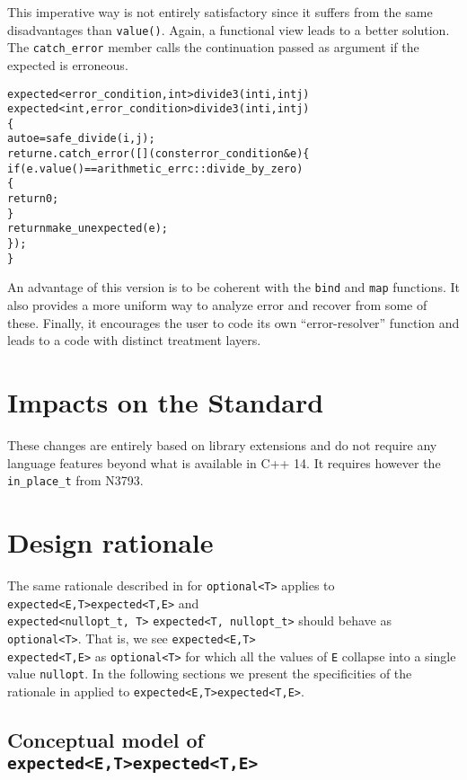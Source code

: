\documentclass[a4paper,10pt]{article}
\newcommand{\cpp}[1]{\lstinline{#1}}
\newcommand{\suppress}[1]{\colorbox{suppress_color}{#1}}
\newcommand{\update}[1]{\colorbox{update_color}{#1}}
\begin{document}
This imperative way is not entirely satisfactory since it suffers from the same disadvantages than \cpp{value()}. Again, a functional view leads to a better solution. The \cpp{catch_error} member calls the continuation passed as argument if the expected is erroneous.

\begin{alltt}
\suppress{expected<error_condition, int> divide3(int i, int j)}
\update{expected<int, error_condition> divide3(int i, int j)}
\{
  auto e = safe_divide(i,j);
  return e.catch_error([](const error_condition& e)\{
    if(e.value() == arithmetic_errc::divide_by_zero)
    \{
      return 0;
    \}
    return make_unexpected(e);
  \});
\}
\end{alltt}

An advantage of this version is to be coherent with the \cpp{bind} and \cpp{map} functions. It also provides a more uniform way to analyze error and recover from some of these. Finally, it encourages the user to code its own ``error-resolver'' function and leads to a code with distinct treatment layers.

\section{Impacts on the Standard}

These changes are entirely based on library extensions and do not require any language features beyond what is available in C++ 14. It requires however the \cpp{in_place_t} from N3793.

\section{Design rationale}

The same rationale described in \cite{OptionalRev4} for \cpp{optional<T>} applies to \suppress{\cpp{expected<E,T>}}\update{\cpp{expected<T,E>}} and \\
\suppress{\cpp{expected<nullopt_t, T>}} \update{\cpp{expected<T, nullopt_t>}} should behave as \cpp{optional<T>}.  That is, we see \suppress{\cpp{expected<E,T>}} \\
\update{\cpp{expected<T,E>}} as \cpp{optional<T>} for which all the values of \cpp{E} collapse into a single value \cpp{nullopt}. In the following sections we present the specificities of the rationale in \cite{OptionalRev4} applied to  \suppress{\cpp{expected<E,T>}}\update{\cpp{expected<T,E>}}.

\subsection{Conceptual model of \suppress{\cpp{expected<E,T>}}\update{\cpp{expected<T,E>}}}
\end{document}
